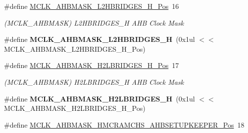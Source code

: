 \begin{DoxyCompactItemize}
\item 
\hypertarget{group___s_a_m_l21___m_c_l_k_ga4ad5d3c40a3540f607c1333ccdae30d7}{}\#define \hyperlink{group___s_a_m_l21___m_c_l_k_ga4ad5d3c40a3540f607c1333ccdae30d7}{M\+C\+L\+K\+\_\+\+A\+H\+B\+M\+A\+S\+K\+\_\+\+L2\+H\+B\+R\+I\+D\+G\+E\+S\+\_\+\+H\+\_\+\+Pos}~16\label{group___s_a_m_l21___m_c_l_k_ga4ad5d3c40a3540f607c1333ccdae30d7}

\begin{DoxyCompactList}\small\item\em (M\+C\+L\+K\+\_\+\+A\+H\+B\+M\+A\+S\+K) L2\+H\+B\+R\+I\+D\+G\+E\+S\+\_\+\+H A\+H\+B Clock Mask \end{DoxyCompactList}\item 
\hypertarget{group___s_a_m_l21___m_c_l_k_ga2e55c46acf876369f5bef73b05ad7013}{}\#define {\bfseries M\+C\+L\+K\+\_\+\+A\+H\+B\+M\+A\+S\+K\+\_\+\+L2\+H\+B\+R\+I\+D\+G\+E\+S\+\_\+\+H}~(0x1ul $<$$<$ M\+C\+L\+K\+\_\+\+A\+H\+B\+M\+A\+S\+K\+\_\+\+L2\+H\+B\+R\+I\+D\+G\+E\+S\+\_\+\+H\+\_\+\+Pos)\label{group___s_a_m_l21___m_c_l_k_ga2e55c46acf876369f5bef73b05ad7013}

\item 
\hypertarget{group___s_a_m_l21___m_c_l_k_ga7f5250546b91de5659df9b3a7898133b}{}\#define \hyperlink{group___s_a_m_l21___m_c_l_k_ga7f5250546b91de5659df9b3a7898133b}{M\+C\+L\+K\+\_\+\+A\+H\+B\+M\+A\+S\+K\+\_\+\+H2\+L\+B\+R\+I\+D\+G\+E\+S\+\_\+\+H\+\_\+\+Pos}~17\label{group___s_a_m_l21___m_c_l_k_ga7f5250546b91de5659df9b3a7898133b}

\begin{DoxyCompactList}\small\item\em (M\+C\+L\+K\+\_\+\+A\+H\+B\+M\+A\+S\+K) H2\+L\+B\+R\+I\+D\+G\+E\+S\+\_\+\+H A\+H\+B Clock Mask \end{DoxyCompactList}\item 
\hypertarget{group___s_a_m_l21___m_c_l_k_ga1e7429edbe94123e06ef2f71da8ce8d3}{}\#define {\bfseries M\+C\+L\+K\+\_\+\+A\+H\+B\+M\+A\+S\+K\+\_\+\+H2\+L\+B\+R\+I\+D\+G\+E\+S\+\_\+\+H}~(0x1ul $<$$<$ M\+C\+L\+K\+\_\+\+A\+H\+B\+M\+A\+S\+K\+\_\+\+H2\+L\+B\+R\+I\+D\+G\+E\+S\+\_\+\+H\+\_\+\+Pos)\label{group___s_a_m_l21___m_c_l_k_ga1e7429edbe94123e06ef2f71da8ce8d3}

\item 
\hypertarget{group___s_a_m_l21___m_c_l_k_ga374b03eac7955927d847a8a2f63fb6ac}{}\#define \hyperlink{group___s_a_m_l21___m_c_l_k_ga374b03eac7955927d847a8a2f63fb6ac}{M\+C\+L\+K\+\_\+\+A\+H\+B\+M\+A\+S\+K\+\_\+\+H\+M\+C\+R\+A\+M\+C\+H\+S\+\_\+\+A\+H\+B\+S\+E\+T\+U\+P\+K\+E\+E\+P\+E\+R\+\_\+\+Pos}~18\label{group___s_a_m_l21___m_c_l_k_ga374b03eac7955927d847a8a2f63fb6ac}


\end{DoxyCompactItemize}
